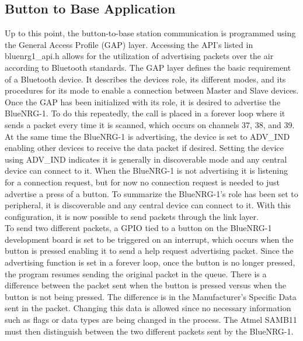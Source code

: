 \documentclass[journal,compsoc]{IEEEtran}
\begin{document}
\subsection{Button to Base Application}
Up to this point, the button-to-base station communication is programmed using the General Access Profile (GAP) layer.  Accessing the API’s listed in bluenrg1\_api.h allows for the utilization of advertising packets over the air according to Bluetooth standards.  The GAP layer defines the basic requirement of a Bluetooth device.  It describes the devices role, its different modes, and its procedures for its mode to enable a connection between Master and Slave devices.  Once the GAP has been initialized with its role, it is desired to advertise the BlueNRG-1.  To do this repeatedly, the call is placed in a forever loop where it sends a packet every time it is scanned, which occurs on channels 37, 38, and 39.  At the same time the BlueNRG-1 is advertising, the device is set to ADV\_IND enabling other devices to receive the data packet if desired.  Setting the device using ADV\_IND indicates it is generally in discoverable mode and any central device can connect to it.  When the BlueNRG-1 is not advertising it is listening for a connection request, but for now no connection request is needed to just advertise a press of a button. To summarize the BlueNRG-1’s role has been set to peripheral, it is discoverable and any central device can connect to it.  With this configuration, it is now possible to send packets through the link layer.\\

\noindent To send two different packets, a GPIO tied to a button on the BlueNRG-1 development board is set to be triggered on an interrupt, which occurs when the button is pressed enabling it to send a help request advertising packet.  Since the advertising function is set in a forever loop, once the button is no longer pressed, the program resumes sending the original packet in the queue.  There is a difference between the packet sent when the button is pressed versus when the button is not being pressed.  The difference is in the Manufacturer’s Specific Data sent in the packet.  Changing this data is allowed since no necessary information such as flags or data types are being changed in the process.  The Atmel SAMB11 must then distinguish between the two different packets sent by the BlueNRG-1.\\
\end{document}
